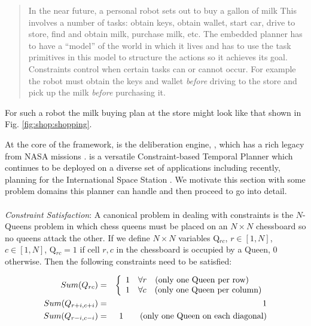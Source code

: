 {\small
  \begin{quote}
    In the near future, a personal robot sets out to buy a gallon of
    milk This involves a number of tasks: obtain keys, obtain wallet,
    start car, drive to store, find and obtain milk, purchase milk,
    etc.  The embedded planner has to have a ``model'' of the world in
    which it lives and has to use the task primitives in this model to
    structure the actions so it achieves its goal. Constraints control
    when certain tasks can or cannot occur. For example the robot must
    obtain the keys and wallet \emph{before} driving to the store and
    pick up the milk \emph{before} purchasing it.
\end{quote}

For such a robot the milk buying plan at the store might look like
that shown in Fig. \ref{fig:shop:shopping}.

At the core of the \rx framework, is the deliberation engine, \eue,
which has a rich legacy from NASA missions \cite{mus98,rajan00,
  jonsson00,aichang04, bresina05}. \eu is a versatile Constraint-based
Temporal Planner which continues to be deployed on a diverse set of
applications including recently, planning for the International Space
Station \cite{barreiro09}. We motivate this section with some problem
domains this planner can handle and then proceed to go into detail.

\paragraph{} {\em Constraint Satisfaction}: A canonical problem in
dealing with constraints is the $N$-Queens problem in which chess queens
must be placed on an  $N \times N$ chessboard so no queens attack the other. %
If we define $N \times N$ variables Q$_{rc}$, $r \in [1,N]$, $c \in
[1,N]$, Q$_{rc} = 1$ if cell $r,c$ in the chessboard is occupied by a
Queen, $0$ otherwise. Then the following constraints need to be
satisfied:

\begin{eqnarray*}
 Sum(Q_{rc}) & = & \left\{
   \begin{array}{l l}
     1 & \forall r \quad \mbox{(only one Queen per row)}\\
     1 & \forall c \quad \mbox{(only one Queen per column)}\\ 
   \end{array} \right. \\
Sum(Q_{r+i,c+i}) & = & 1\\
Sum(Q_{r-i,c-i}) & = & 1 \qquad \mbox{(only one Queen on each diagonal)}\\
\end{eqnarray*} 

}
